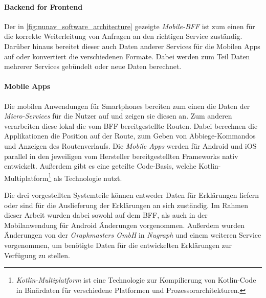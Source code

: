 \paragraph{Backend for Frontend} Der in \autoref{fig:nunav_software_architecture} gezeigte \textit{Mobile-BFF} ist zum einen für die korrekte Weiterleitung von Anfragen an den richtigen Service zuständig. Darüber hinaus bereitet dieser auch Daten anderer Services für die Mobilen Apps auf oder konvertiert die verschiedenen Formate. Dabei werden zum Teil Daten mehrerer Services gebündelt oder neue Daten berechnet. 

\paragraph{Mobile Apps} Die mobilen Anwendungen für Smartphones bereiten zum einen die Daten der \textit{Micro-Services} für die Nutzer auf und zeigen sie diesen an. Zum anderen verarbeiten diese lokal die vom BFF bereitgestellte Routen. Dabei berechnen die Applikationen die Position auf der Route, zum Geben von Abbiege-Kommandos und Anzeigen des Routenverlaufs. Die \textit{Mobile Apps} werden für Android und iOS parallel in den jeweiligen vom Hersteller bereitgestellten Frameworks nativ entwickelt. Außerdem gibt es eine geteilte Code-Basis, welche Kotlin-Multiplatform\footnote{\textit{Kotlin-Multiplatform} ist eine Technologie zur Kompilierung von Kotlin-Code in Binärdaten für verschiedene Platformen und Prozessorarchitekturen.} als Technologie nutzt.

\bigskip

Die drei vorgestellten Systemteile können entweder Daten für Erklärungen liefern oder sind für die Auslieferung der Erklärungen an sich zuständig. Im Rahmen dieser Arbeit wurden dabei sowohl auf dem BFF, als auch in der Mobilanwendung für Android Änderungen vorgenommen. Außerdem wurden Änderungen von der \textit{Graphmasters GmbH} in \textit{Nugraph} und einem weiteren Service vorgenommen, um benötigte Daten für die entwickelten Erklärungen zur Verfügung zu stellen.